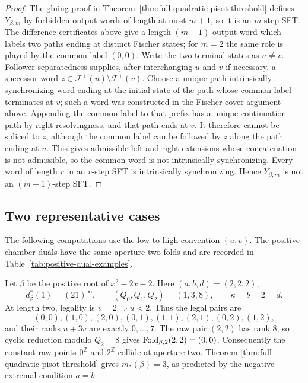 \begin{proof}
The gluing proof in Theorem~\ref{thm:full-quadratic-pisot-threshold} defines
$Y_{\beta,m}$ by forbidden output words of length at most $m+1$, so it is an
$m$-step SFT.  The difference certificates above give a length-$(m-1)$
output word which labels two paths ending at distinct Fischer states; for
$m=2$ the same role is played by the common label $(0,0)$.  Write the two
terminal states as $u\ne v$.  Follower-separatedness supplies, after
interchanging $u$ and $v$ if necessary, a successor word
$z\in\mathcal F^+(u)\setminus\mathcal F^+(v)$.  Choose a unique-path
intrinsically synchronizing word ending at the initial state of the path
whose common label terminates at $v$; such a word was constructed in the
Fischer-cover argument above.  Appending the common label to that prefix has
a unique continuation path by right-resolvingness, and that path ends at
$v$.  It therefore cannot be spliced to $z$, although the common label can
be followed by $z$ along the path ending at $u$.  This gives admissible left
and right extensions whose concatenation is not admissible, so the common
word is not intrinsically synchronizing.  Every word of length $r$ in an
$r$-step SFT is intrinsically synchronizing.  Hence $Y_{\beta,m}$ is not an
$(m-1)$-step SFT.
\end{proof}

\subsection{Two representative cases}

The following computations use the low-to-high convention $(u,v)$.  The
positive-chamber duals have the same aperture-two folds and are recorded in
Table~\ref{tab:positive-dual-examples}.

\begin{example}
Let $\beta$ be the positive root of $x^2-2x-2$.  Here
$(a,b,d)=(2,2,2)$,
\[
d_\beta^*(1)=(21)^\infty,\qquad (Q_0,Q_1,Q_2)=(1,3,8),
\qquad \kappa=b=2=d.
\]
At length two, legality is $v=2\Rightarrow u<2$.  Thus the legal pairs are
\[
(0,0),(1,0),(2,0),(0,1),(1,1),(2,1),(0,2),(1,2),
\]
and their ranks $u+3v$ are exactly $0,\ldots,7$.  The raw pair $(2,2)$ has
rank $8$, so cyclic reduction modulo $Q_2=8$ gives
$\mathrm{Fold}_{\beta,2}(2,2)=(0,0)$.  Consequently the constant raw points
$0^{\mathbb Z}$ and $2^{\mathbb Z}$ collide at aperture two.  Theorem
\ref{thm:full-quadratic-pisot-threshold} gives $m_*(\beta)=3$, as predicted by
the negative extremal condition $a=b$.
\end{example}


